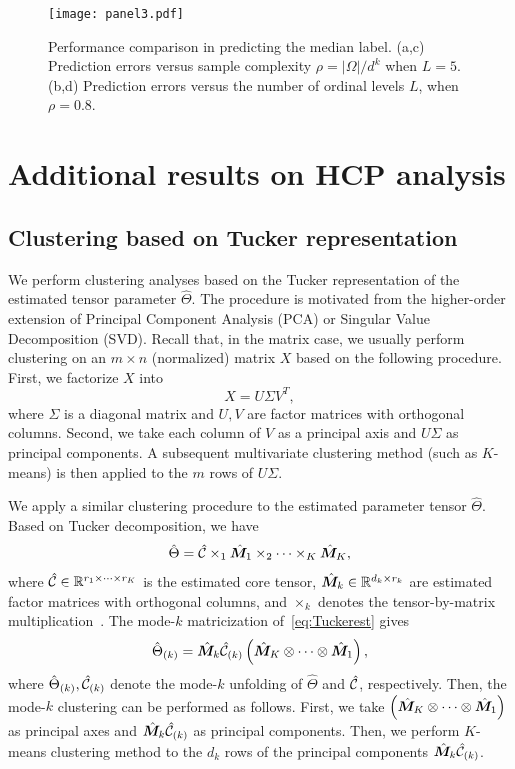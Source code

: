 \documentclass[11pt]{article}
\theoremstyle{plain}
\theoremstyle{definition}
\begin{document}
\begin{figure}[H]
  \begin{center}
    \texttt{[image: panel3.pdf]}
  \end{center}
  \caption{Performance comparison in predicting the median label. (a,c) Prediction errors versus sample complexity $\rho=|\Omega|/d^k$ when $L=5$. (b,d) Prediction errors versus the number of ordinal levels $L$, when $\rho=0.8.$}
\end{figure}

\section{Additional results on HCP analysis}
\subsection{Clustering based on Tucker representation}\label{sec:clustering}
We perform clustering analyses based on the Tucker representation of the estimated tensor parameter $\hat\Theta$. The procedure is motivated from the higher-order extension of Principal Component Analysis (PCA) or Singular Value Decomposition (SVD). Recall that, in the matrix case, we usually perform clustering on an $m\times n$ (normalized) matrix $X$ based on the following procedure. First, we factorize $X$ into
\begin{equation}
X = U\Sigma V^T,
\end{equation}
where $\Sigma$ is a diagonal matrix and $ U,V$ are factor matrices with orthogonal columns. Second, we take each column of $V$ as a principal axis and $U\Sigma$ as principal components. A subsequent multivariate clustering method (such as $K$-means) is then applied to the $m$ rows of $U\Sigma$. 


We apply a similar clustering procedure to the estimated parameter tensor $\hat\Theta$. Based on Tucker decomposition, we have
\begin{equation}\label{eq:Tuckerest}
\hat \Theta = \hat {\mathcal{C}}\times_1\hat {\bm M}_1\times_2\cdots\times_K\hat {\bm M}_K,
\end{equation}
where $\hat {\mathcal{C}}\in\mathbb{R}^{r_1\times \cdots \times r_K}$ is the estimated core tensor, $\hat {\bm M}_k\in\mathbb{R}^{d_k\times r_k}$ are estimated factor matrices with orthogonal columns, and $\times_k$ denotes the tensor-by-matrix multiplication~\citep{kolda2009tensor}. The mode-$k$ matricization of~\eqref{eq:Tuckerest} gives
\begin{equation}
\hat \Theta_{(k)} = \hat {\bm M}_k\hat {\mathcal{C}}_{(k)}\left(\hat {\bm M}_K\otimes\cdots\otimes\hat {\bm M}_1\right),
\end{equation}
where $\hat \Theta_{(k)} , \hat {\mathcal{C}}_{(k)}$ denote the mode-$k$ unfolding of $\hat \Theta$ and $\hat {\mathcal{C}}$, respectively. Then, the mode-$k$ clustering can be performed as follows. First, we take $\left(\hat {\bm M}_K\otimes\cdots\otimes\hat {\bm M}_1\right)$ as principal axes and $\hat {\bm M}_k\hat {\mathcal{C}}_{(k)}$ as principal components. Then, we perform $K$-means clustering method to the $d_k$ rows of the principal components $\hat {\bm M}_k\hat {\mathcal{C}}_{(k)}$. 
\end{document}
